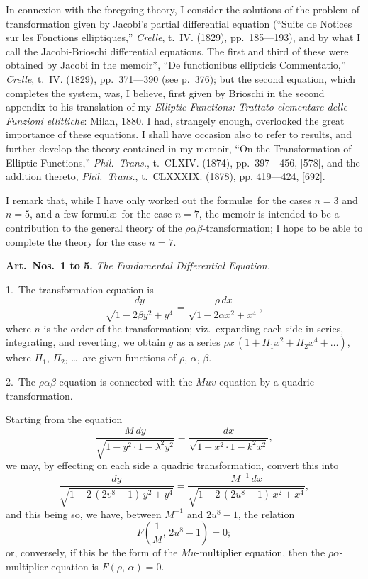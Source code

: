 \documentclass[11pt,a4paper]{book}
\begin{document}
In connexion with the foregoing theory, I consider the solutions of the problem
of transformation given by Jacobi's partial differential equation (``Suite de Notices sur
les Fonctions elliptiques,'' \textit{Crelle}, t.~IV. (1829), pp.~185---193), and by what I call the
Jacobi-Brioschi differential equations. The first and third of these were obtained by
Jacobi in the memoir*, ``De functionibus ellipticis Commentatio,'' \textit{Crelle}, t.~IV. (1829),
pp.~371---390 (see p.~376); but the second equation, which completes the system, was,
I believe, first given by Brioschi in the second appendix to his translation of my
\textit{Elliptic Functions: Trattato elementare delle Funzioni ellittiche}: Milan, 1880. I had,
strangely enough, overlooked the great importance of these equations. I shall have
occasion also to refer to results, and further develop the theory contained in my
memoir, ``On the Transformation of Elliptic Functions,'' \textit{Phil.\ Trans.}, t.~CLXIV. (1874),
pp.~397---456, [578], and the addition thereto, \textit{Phil.\ Trans.}, t.~CLXXXIX. (1878), pp.
419---424, [692].

I remark that, while I have only worked out the formul\ae\ for the cases $n = 3$
and $n = 5$, and a few formul\ae\ for the case $n = 7$, the memoir is intended to be a
contribution to the general theory of the $\rho\alpha\beta$-transformation; I hope to be able to
complete the theory for the case $n = 7$.

\begin{flushright}
\end{flushright}

\newpage
\noindent\textbf{Art.\ Nos.\ 1 to 5.} \textit{The Fundamental Differential Equation.}

1.\ The transformation-equation is
\[
\frac{dy}{\sqrt{1 - 2\beta y^2 + y^4}} = \frac{\rho\, dx}{\sqrt{1 - 2\alpha x^2 + x^4}},
\]
where $n$ is the order of the transformation; viz.\ expanding each side in series,
integrating, and reverting, we obtain $y$ as a series $\rho x\, (1 + \Pi_1 x^2 + \Pi_2 x^4 + \ldots)$,
where $\Pi_1$, $\Pi_2$, \ldots\ are given functions of $\rho$, $\alpha$, $\beta$.

2.\ The $\rho\alpha\beta$-equation is connected with the $Muv$-equation by a quadric transformation.

Starting from the equation
\[
\frac{M\, dy}{\sqrt{1 - y^2 \cdot 1 - \lambda^2 y^2}} = \frac{dx}{\sqrt{1 - x^2 \cdot 1 - k^2 x^2}},
\]
we may, by effecting on each side a quadric transformation, convert this into
\[
\frac{dy}{\sqrt{1 - 2\, (2v^8 - 1)\, y^2 + y^4}}
= \frac{M^{-1}\, dx}{\sqrt{1 - 2\, (2u^8 - 1)\, x^2 + x^4}},
\]
and this being so, we have, between $M^{-1}$ and $2u^8 - 1$, the relation
\[
F\left(\frac{1}{M},\, 2u^8 - 1\right) = 0;
\]
or, conversely, if this be the form of the $Mu$-multiplier equation, then the $\rho\alpha$-multiplier
equation is $F(\rho,\, \alpha) = 0$.
\end{document}
